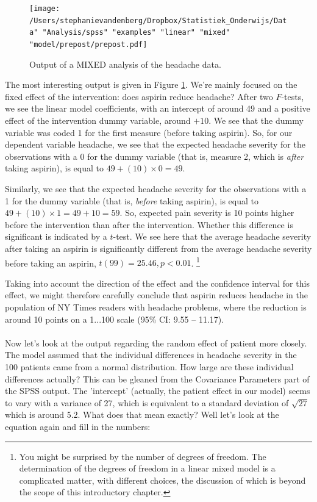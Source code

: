 \documentclass[]{book}\usepackage[]{graphicx}\usepackage[]{color}
\begin{document}
\begin{figure}[h]
    \begin{center}
       \texttt{[image: /Users/stephanievandenberg/Dropbox/Statistiek\_Onderwijs/Data" "Analysis/spss" "examples" "linear" "mixed" "model/prepost/prepost.pdf]}
    \end{center}
    \label{fig:prepost}
    \caption{Output of a MIXED analysis of the headache data.}
\end{figure}

The most interesting output is given in Figure \ref{fig:prepost}. We're mainly focused on the fixed effect of the intervention: does aspirin reduce headache? After two $F$-tests, we see the linear model coefficients, with an intercept of around 49 and a positive effect of the intervention dummy variable, around $+10$. We see that the dummy variable was coded 1 for the first measure (before taking aspirin). So, for our dependent variable headache, we see that the expected headache severity for the observations with a 0 for the dummy variable (that is, measure 2, which is \textit{after} taking aspirin), is equal to $49 + (10) \times 0 = 49$. 

Similarly, we see that the expected headache severity for the observations with a 1 for the dummy variable (that is, \textit{before} taking aspirin), is equal to $49 + (10) \times 1 = 49 + 10 = 59$. So, expected pain severity is 10 points higher before the intervention than after the intervention. Whether this difference is significant is indicated by a $t$-test. We see here that the average headache severity after taking an aspirin is significantly different from the average headache severity before taking an aspirin, $t(99) = 25.46, p < 0.01$. \footnote{You might be surprised by the number of degrees of freedom. The determination of the degrees of freedom in a linear mixed model is a complicated matter, with different choices, the discussion of which is beyond the scope of this introductory chapter.}


Taking into account the direction of the effect and the confidence interval for this effect, we might therefore carefully conclude that aspirin reduces headache in the population of NY Times readers with headache problems, where the reduction is around 10 points on a 1...100 scale (95\% CI: 9.55 -- 11.17). 
\\
\\
Now let's look at the output regarding the random effect of patient more closely. The model assumed that the individual differences in headache severity in the 100 patients came from a normal distribution. How large are these individual differences actually? This can be gleaned from the Covariance Parameters part of the SPSS output. The 'intercept' (actually, the patient effect in our model) seems to vary with a variance of 27, which is equivalent to a standard deviation of $\sqrt{27}$ which is around 5.2. What does that mean exactly? Well let's look at the equation again and fill in the numbers:
\end{document}
